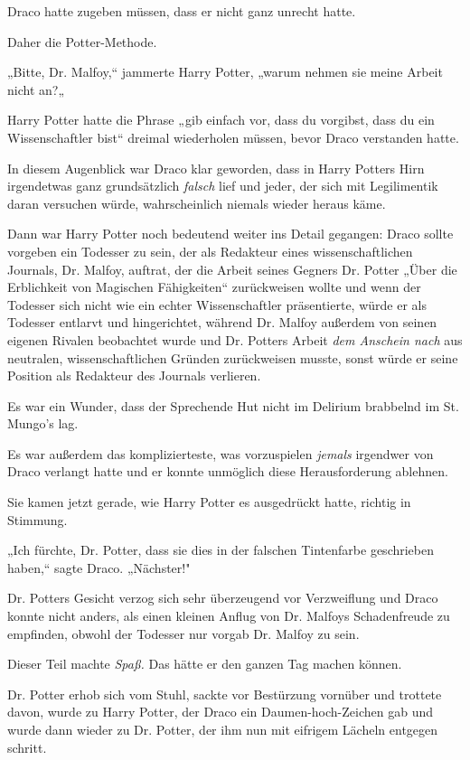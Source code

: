{Draco hatte zugeben müssen, dass er nicht ganz unrecht hatte.

Daher die Potter-Methode.

„Bitte, Dr. Malfoy,“ jammerte Harry Potter, „warum nehmen sie meine Arbeit nicht an?„

Harry Potter hatte die Phrase „gib einfach vor, dass du vorgibst, dass du ein Wissenschaftler bist“ dreimal wiederholen müssen, bevor Draco verstanden hatte.

In diesem Augenblick war Draco klar geworden, dass in Harry Potters Hirn irgendetwas ganz grundsätzlich \emph{falsch} lief und jeder, der sich mit Legilimentik daran versuchen würde, wahrscheinlich niemals wieder heraus käme.

Dann war Harry Potter noch bedeutend weiter ins Detail gegangen: Draco sollte vorgeben ein Todesser zu sein, der als Redakteur eines wissenschaftlichen Journals, Dr. Malfoy, auftrat, der die Arbeit seines Gegners Dr. Potter „Über die Erblichkeit von Magischen Fähigkeiten“ zurückweisen wollte und wenn der Todesser sich nicht wie ein echter Wissenschaftler präsentierte, würde er als Todesser entlarvt und hingerichtet, während Dr. Malfoy außerdem von seinen eigenen Rivalen beobachtet wurde und Dr. Potters Arbeit \emph{dem Anschein nach} aus neutralen, wissenschaftlichen Gründen zurückweisen musste, sonst würde er seine Position als Redakteur des Journals verlieren.

Es war ein Wunder, dass der Sprechende Hut nicht im Delirium brabbelnd im St. Mungo's lag.

Es war außerdem das komplizierteste, was vorzuspielen \emph{jemals} irgendwer von Draco verlangt hatte und er konnte unmöglich diese Herausforderung ablehnen.

Sie kamen jetzt gerade, wie Harry Potter es ausgedrückt hatte, richtig in Stimmung.

„Ich fürchte, Dr. Potter, dass sie dies in der falschen Tintenfarbe geschrieben haben,“ sagte Draco. „Nächster!"

Dr. Potters Gesicht verzog sich sehr überzeugend vor Verzweiflung und Draco konnte nicht anders, als einen kleinen Anflug von Dr. Malfoys Schadenfreude zu empfinden, obwohl der Todesser nur vorgab Dr. Malfoy zu sein.

Dieser Teil machte \emph{Spaß.} Das hätte er den ganzen Tag machen können.

Dr. Potter erhob sich vom Stuhl, sackte vor Bestürzung vornüber und trottete davon, wurde zu Harry Potter, der Draco ein Daumen-hoch-Zeichen gab und wurde dann wieder zu Dr. Potter, der ihm nun mit eifrigem Lächeln entgegen schritt.

}
